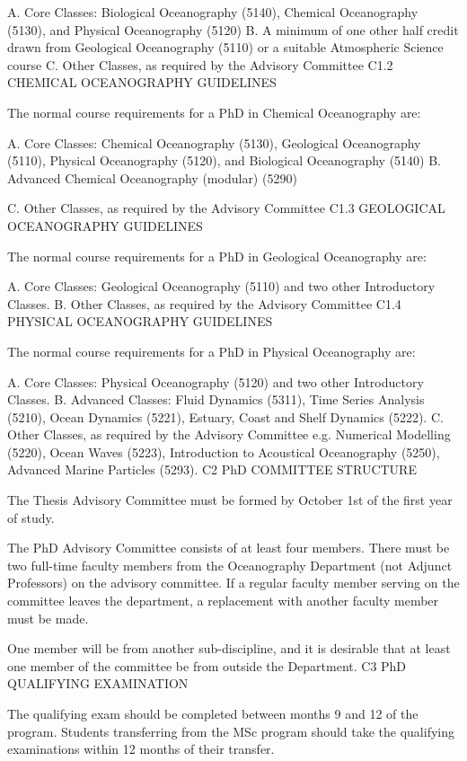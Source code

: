A.	Core Classes: Biological Oceanography (5140), Chemical Oceanography (5130), and Physical Oceanography (5120)
B.	A minimum of one other half credit drawn from Geological Oceanography (5110) or a suitable Atmospheric Science course
C.	Other Classes, as required by the Advisory Committee
C1.2	CHEMICAL OCEANOGRAPHY GUIDELINES

The normal course requirements for a PhD in Chemical Oceanography are:

A.	Core Classes: Chemical Oceanography (5130), Geological Oceanography (5110), Physical Oceanography (5120), and Biological Oceanography (5140)
B.	Advanced Chemical Oceanography (modular) (5290)
 

C.	Other Classes, as required by the Advisory Committee
C1.3	GEOLOGICAL OCEANOGRAPHY GUIDELINES

The normal course requirements for a PhD in Geological Oceanography are:

A.	Core Classes: Geological Oceanography (5110) and two other Introductory Classes.
B.	Other Classes, as required by the Advisory Committee
C1.4	PHYSICAL OCEANOGRAPHY GUIDELINES

The normal course requirements for a PhD in Physical Oceanography are:

A.	Core Classes: Physical Oceanography (5120) and two other Introductory Classes.
B.	Advanced Classes: Fluid Dynamics (5311), Time Series Analysis (5210), Ocean Dynamics (5221), Estuary, Coast and Shelf Dynamics (5222).
C.	Other Classes, as required by the Advisory Committee e.g. Numerical Modelling (5220), Ocean Waves (5223), Introduction to Acoustical Oceanography (5250), Advanced Marine Particles (5293).
C2	PhD COMMITTEE STRUCTURE

The Thesis Advisory Committee must be formed by October 1st of the first year of study.

The PhD Advisory Committee consists of at least four members. There must be two full-time faculty members from the Oceanography Department (not Adjunct Professors) on the advisory committee. If a regular faculty member serving on the committee leaves the department, a replacement with another faculty member must be made.

One member will be from another sub-discipline, and it is desirable that at least one member of the committee be from outside the Department.
C3	PhD QUALIFYING EXAMINATION

The qualifying exam should be completed between months 9 and 12 of the program.
Students transferring from the MSc program should take the qualifying examinations within 12 months of their transfer.

